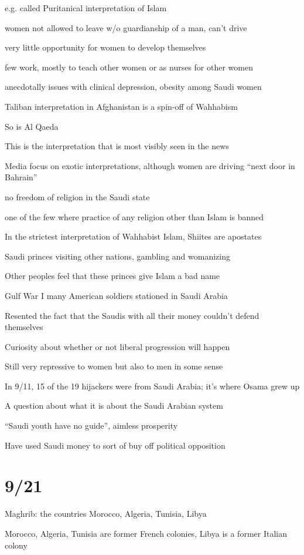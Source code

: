\documentclass[12pt]{article}
\begin{document}
e.g. called Puritanical interpretation of Islam

women not allowed to leave w/o guardianship of a man, can't drive

very little opportunity for women to develop themselves

few work, mostly to teach other women or as nurses for other women

anecdotally issues with clinical depression, obesity among Saudi women

Taliban interpretation in Afghanistan is a spin-off of Wahhabism

So is Al Qaeda

This is the interpretation that is most visibly seen in the news

Media focus on exotic interpretations, although women are driving ``next door in Bahrain''

no freedom of religion in the Saudi state

one of the few where practice of any religion other than Islam is banned

In the strictest interpretation of Wahhabist Islam, Shiites are apostates

Saudi princes visiting other nations, gambling and womanizing

Other peoples feel that these princes give Islam a bad name

Gulf War I many American soldiers stationed in Saudi Arabia

Resented the fact that the Saudis with all their money couldn't defend themselves

Curiosity about whether or not liberal progression will happen

Still very repressive to women but also to men in some sense

In 9/11, 15 of the 19 hijackers were from Saudi Arabia; it's where Osama grew up

A question about what it is about the Saudi Arabian system

``Saudi youth have no guide'', aimless prosperity

Have used Saudi money to sort of buy off political opposition

\section{9/21}

\noindent
Maghrib: the countries Morocco, Algeria, Tunisia, Libya

Morocco, Algeria, Tunisia are former French colonies, Libya is a former Italian colony
\end{document}
